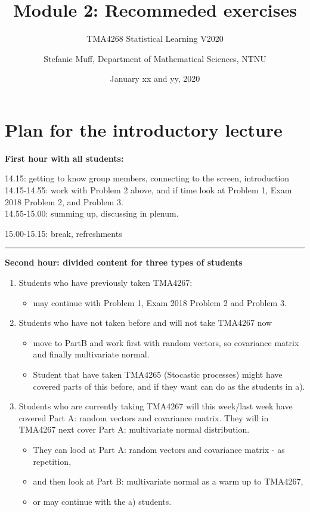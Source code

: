 \documentclass[]{article}
\title{Module 2: Recommeded exercises}
\subtitle{TMA4268 Statistical Learning V2020}
\author{Stefanie Muff, Department of Mathematical Sciences, NTNU}
\date{January xx and yy, 2020}
\providecommand{\tightlist}{%
  \setlength{\itemsep}{0pt}\setlength{\parskip}{0pt}}
\begin{document}
\maketitle

{
\hypersetup{linkcolor=black}
\setcounter{tocdepth}{2}
\tableofcontents
}
\section{Plan for the introductory
lecture}\label{plan-for-the-introductory-lecture}

\textbf{First hour with all students:}

14.15: getting to know group members, connecting to the screen,
introduction\\
14.15-14.55: work with Problem 2 above, and if time look at Problem 1,
Exam 2018 Problem 2, and Problem 3.\\
14.55-15.00: summing up, discussing in plenum.

15.00-15.15: break, refreshments

\begin{center}\rule{0.5\linewidth}{\linethickness}\end{center}

\textbf{Second hour: divided content for three types of students}

\begin{enumerate}
\def\labelenumi{\alph{enumi})}
\tightlist
\item
  Students who have previously taken TMA4267:

  \begin{itemize}
  \tightlist
  \item
    may continue with Problem 1, Exam 2018 Problem 2 and Problem 3.
  \end{itemize}
\item
  Students who have not taken before and will not take TMA4267 now

  \begin{itemize}
  \tightlist
  \item
    move to PartB and work first with random vectors, so covariance
    matrix and finally multivariate normal.
  \item
    Student that have taken TMA4265 (Stocastic processes) might have
    covered parts of this before, and if they want can do as the
    students in a).
  \end{itemize}
\item
  Students who are currently taking TMA4267 will this week/last week
  have covered Part A: random vectors and covariance matrix. They will
  in TMA4267 next cover Part A: multivariate normal distribution.

  \begin{itemize}
  \tightlist
  \item
    They can lood at Part A: random vectors and covariance matrix - as
    repetition,
  \item
    and then look at Part B: multivariate normal as a warm up to
    TMA4267,
  \item
    or may continue with the a) students.
  \end{itemize}
\end{enumerate}
\end{document}
